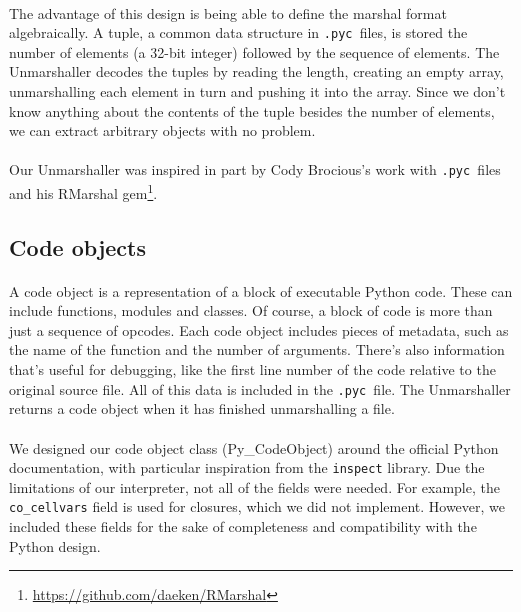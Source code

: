 \documentclass{article}
\newcommand{\pyc}{\texttt{.pyc~}}
\begin{document}
\paragraph{}
The advantage of this design is being able to define the marshal format algebraically. A tuple, a common data structure in \pyc files, is stored the number of elements (a 32-bit integer) followed by the sequence of elements. The Unmarshaller decodes the tuples by reading the length, creating an empty array, unmarshalling each element in turn and pushing it into the array. Since we don't know anything about the contents of the tuple besides the number of elements, we can extract arbitrary objects with no problem.

\paragraph{}
Our Unmarshaller was inspired in part by Cody Brocious's work with \pyc files and his RMarshal gem\footnote{\url{https://github.com/daeken/RMarshal}}.

\subsection{Code objects}\label{code object}

\paragraph{}
A code object is a representation of a block of executable Python code. These can include functions, modules and classes. Of course, a block of code is more than just a sequence of opcodes. Each code object includes pieces of metadata, such as the name of the function and the number of arguments. There's also information that's useful for debugging, like the first line number of the code relative to the original source file. All of this data is included in the \pyc file. The Unmarshaller returns a code object when it has finished unmarshalling a file.

\paragraph{}
We designed our code object class (Py\_CodeObject) around the official Python documentation, with particular inspiration from the \texttt{inspect} library. Due the limitations of our interpreter, not all of the fields were needed. For example, the \texttt{co\_cellvars} field is used for closures, which we did not implement. However, we included these fields for the sake of completeness and compatibility with the Python design.
\end{document}
